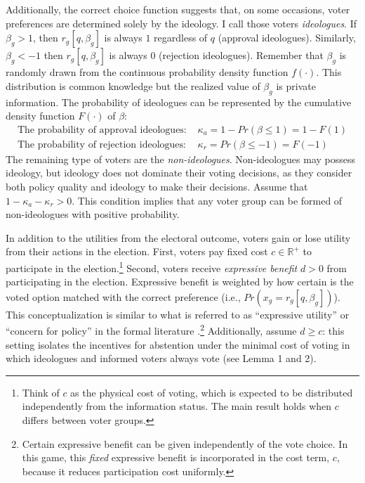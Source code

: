 \documentclass[letterpaper, 12pt]{article}
\begin{document}
    \par Additionally, the correct choice function suggests that, on some occasions, voter preferences are determined solely by the ideology. I call those voters \textit{ideologues}. If $\beta_g > 1$, then $r_g[q, \beta_g]$ is always $1$ regardless of $q$ (approval ideologues). Similarly, $\beta_g < -1$ then $r_g[q, \beta_g]$ is always $0$ (rejection ideologues). Remember that $\beta_g$ is randomly drawn from the continuous probability density function $f(\cdot)$. This distribution is common knowledge but the realized value of $\beta_g$ is private information. The probability of ideologues can be represented by the cumulative density function $F(\cdot)$ of $\beta$:
    \begin{align}
    \text{The probability of approval ideologues: } &\kappa_{a} = 1 - Pr(\beta \leq 1) = 1 - F(1)   \\
    \text{The probability of rejection ideologues: } &\kappa_{r} = Pr(\beta \leq -1) = F(-1)   
    \end{align}
    \noindent The remaining type of voters are the \textit{non-ideologues}. Non-ideologues may possess ideology, but ideology does not dominate their voting decisions, as they consider both policy quality and ideology to make their decisions. Assume that $1-\kappa_{a} - \kappa_{r} >0$. This condition implies that any voter group can be formed of non-ideologues with positive probability.
    
    \par In addition to the utilities from the electoral outcome, voters gain or lose utility from their actions in the election.  First, voters pay fixed cost $c \in \mathbb{R}^+$ to participate in the election.\footnote{Think of $c$ as the physical cost of voting, which is expected to be distributed independently from the information status. The main result holds when $c$ differs between voter groups.} Second, voters receive \textit{expressive benefit} $d > 0$ from participating in the election. Expressive benefit is weighted by how certain is the voted option matched with the correct preference (i.e., $Pr(x_g=r_g[q, \beta_g])$). 
    This conceptualization is similar to what is referred to as ``expressive utility'' or ``concern for policy'' in the formal literature \citep{Dewan2008thqu, Little2015pran}.\footnote{Certain expressive benefit can be given independently of the vote choice. In this game, this \textit{fixed} expressive benefit is incorporated in the cost term, $c$, because it reduces participation cost uniformly.} Additionally, assume $d \geq c$: this setting isolates the incentives for abstention under the minimal cost of voting in which ideologues and informed voters always vote (see Lemma 1 and 2).  
    
\end{document}
